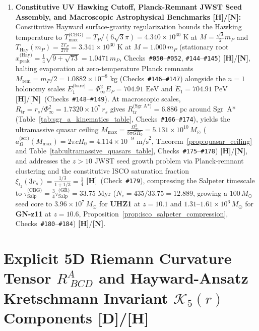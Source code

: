 \documentclass[11pt,a4paper]{article}
\newcommand{\catD}{\textbf{\textcolor{blue!75!black}{[D]}}}
\newcommand{\catH}{\textbf{\textcolor{orange!85!black}{[H]}}}
\newcommand{\catN}{\textbf{\textcolor{teal!75!black}{[N]}}}
\theoremstyle{plain}
\theoremstyle{definition}
\theoremstyle{remark}
\numberwithin{equation}{section}
\begin{document}
\begin{enumerate}
    \item \textbf{Constitutive UV Hawking Cutoff, Planck-Remnant JWST Seed Assembly, and Macroscopic Astrophysical Benchmarks \catH/\catN:} Constitutive Hayward surface-gravity regularization bounds the Hawking temperature to $T_{\max}^{\text{(CBG)}} = T_P/(6\sqrt{3}\pi) = 4.340 \times 10^{30}\text{ K}$ at $M = \frac{\sqrt{3}}{2}m_P$ and $T_{\text{Hay}}(m_P) = \frac{2T_P}{27\pi} = 3.341 \times 10^{30}\text{ K}$ at $M = 1.000\,m_P$ (stationary root $x_{\text{peak}}^{\text{(Hay)}} = \frac{1}{4}\sqrt{9+\sqrt{73}} = 1.0471\,m_P$, Checks~\texttt{\#050}--\texttt{\#052}, \texttt{\#144}--\texttt{\#145}) \catH/\catN, halting evaporation at zero-temperature Planck remnants $M_{\text{rem}} = m_P / 2 = 1.0882 \times 10^{-8}\text{ kg}$ (Checks~\texttt{\#146}--\texttt{\#147}) alongside the $n=1$ holonomy scales $E_1^{\text{(bare)}} = \Phi_{\infty}^2 E_P = 704.91\text{ EeV}$ and $\widetilde{E}_1 = 704.91\text{ PeV}$ \catH/\catN\ (Checks~\texttt{\#148}--\texttt{\#149}). At macroscopic scales, $R_{\text{tr}} = r_s / \Phi_{\infty}^2 = 1.7320 \times 10^7\,r_s$ gives $R_{\text{tr}}^{\text{(Sgr A*)}} = 6.886\text{ pc}$ around Sgr~A* (Table~\ref{tab:sgr_a_kinematics_table}, Checks~\texttt{\#166}--\texttt{\#174}), yields the ultramassive quasar ceiling $M_{\max} = \frac{\Omega_{\infty}^3}{8\pi G H_0} = 5.131 \times 10^{10}\,M_\odot$ ($a_{\Omega}^{\text{(scr)}}(M_{\max}) = 2\pi c H_0 = 4.114 \times 10^{-9}\text{ m/s}^2$, Theorem~\ref{prop:quasar_ceiling} and Table~\ref{tab:ultramassive_quasars_table}, Checks~\texttt{\#175}--\texttt{\#178}) \catH/\catN, and addresses the $z > 10$ JWST seed growth problem via Planck-remnant clustering and the constitutive ISCO saturation fraction $\xi_{t_2}(3r_s) = \frac{1/3}{1+1/3} = \frac{1}{4}$ \catH\ (Check~\texttt{\#179}), compressing the Salpeter timescale to $\tau_{\text{Salp}}^{\text{(CBG)}} = \frac{3}{4}\tau_{\text{Salp}}^{\text{(GR)}} = 33.75\text{ Myr}$ ($N_e = 435/33.75 = 12.889$, growing a $100\,M_\odot$ seed core to $3.96 \times 10^7\,M_\odot$ for \textbf{UHZ1} at $z=10.1$ and $1.31\text{--}1.61 \times 10^6\,M_\odot$ for \textbf{GN-z11} at $z=10.6$, Proposition~\ref{prop:isco_salpeter_compression}, Checks~\texttt{\#180}--\texttt{\#184}) \catH/\catN.
\end{enumerate}

\appendix

\section{\texorpdfstring{Explicit 5D Riemann Curvature Tensor $R^A_{\;BCD}$ and Hayward-Ansatz Kretschmann Invariant $\mathcal{K}_5(r)$ Components \catD/\catH}{Explicit 5D Riemann Curvature Tensor and Hayward-Ansatz Kretschmann Invariant Components}}
\label{app:riemann_components}
\end{document}
